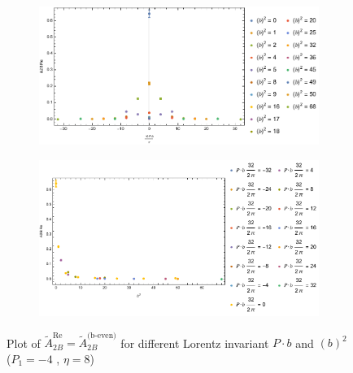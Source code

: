 \documentclass[]{article}
\numberwithin{equation}{section}
\newcommand{\tAmp}{\widetilde{A}}
\newcommand{\tAmp}{\ensuremath{\widetilde{A}^{(+)}}}
\begin{document}
\begin{figure}[h!]
     \centering
     \begin{subfigure}[b]{0.45\textwidth}
         \centering
         \includegraphics[width=\textwidth]{Amp_plots/bP_A2B_b_even_P1_-4_eta_8.pdf}
     \end{subfigure}
     \begin{subfigure}[b]{0.45\textwidth}
         \centering
         \includegraphics[width=\textwidth]{Amp_plots/bsq_A2B_b_even_P1_-4_eta_8.pdf}
     \end{subfigure}
        \caption{Plot of $\tAmp^{\text{Re}}_{2B}=\tAmp^{\text{(b-even)}}_{2B}$ for different Lorentz invariant $P\cdot b$ and $(b)^2$  ($P_{1} = -4$ , $\eta=8$)}
\end{figure}
\pagebreak
\end{document}
